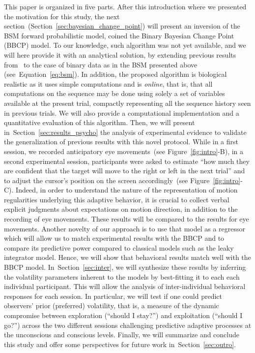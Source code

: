 \documentclass[12pt,english]{article}%
\newcommand{\citet}[1]{\textcite{#1}}
\newcommand{\seeFig}[1]{Figure~\ref{fig:#1}}
\newcommand{\seeEq}[1]{Equation~\ref{eq:#1}}
\newcommand{\seeSec}[1]{Section~\ref{sec:#1}}
\begin{document}
This paper is organized in five parts.
After this introduction where we presented the motivation for this study,
the next section~(\seeSec{bayesian_change_point}) will present
an inversion of the BSM forward probabilistic model,
coined the Binary Bayesian Change Point (BBCP) model.
To our knowledge, such algorithm was not yet available, and
we will here provide it with an analytical solution,
by extending previous results from~\citet{AdamsMackay2007}
to the case of binary data as in the BSM presented above (see~\seeEq{bsm}).
In addition, the proposed algorithm is biological realistic 
as it uses simple computations and is \emph{online},
that is, that all computations on the sequence may be done
using solely a set of variables available at the present trial,
compactly representing all the sequence history seen in previous trials.
We will also provide a computational implementation
and a quantitative evaluation of this algorithm.
Then, we will present in~\seeSec{results_psycho} the analysis of experimental evidence
to validate the generalization of previous results %
with this novel protocol. %
While in a first session, we recorded anticipatory eye movements~(see \seeFig{intro}-B),
in a second experimental session, participants were asked to estimate
``how much they are confident that
the target will move to the right or left in the next trial'' and
to adjust the cursor's position on the screen accordingly~(see \seeFig{intro}-C).
Indeed, in order to understand the nature of the representation of motion regularities underlying this adaptive behavior,
it is crucial to collect verbal explicit judgments
about expectations on motion direction,
in addition to the recording of eye movements.
These results will be compared to the results for eye movements.
Another novelty of our approach is to use that model as a regressor
which will allow us to match experimental results with the BBCP
and to compare its predictive power compared to classical models such as the leaky integrator model.
Hence, we will show that behavioral results match well
with the BBCP model.
In~\seeSec{inter}, we will synthesize these results
by inferring the volatility parameters inherent to the models
by best-fitting it to each each individual participant.
This will allow the analysis of inter-individual behavioral responses for each session.
In particular, we will test if one could predict observers' prior (preferred) volatility,
that is, a measure of the dynamic compromise between exploration (``should I stay?'')
and exploitation (``should I go?'')
across the two different sessions challenging predictive adaptive processes
at the unconscious and conscious levels.
Finally, we will summarize and conclude this study and
offer some perspectives for future work in~\seeSec{outro}.
%
\end{document}
